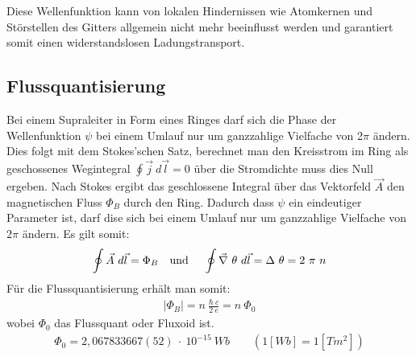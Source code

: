 \documentclass[12pt]{article}
\begin{document}
Diese Wellenfunktion kann von lokalen Hindernissen wie Atomkernen und Störstellen des Gitters allgemein nicht mehr beeinflusst werden und garantiert somit einen widerstandslosen Ladungstransport.

\subsection{Flussquantisierung}
\label{flussquantisierung}

Bei einem Supraleiter in Form eines Ringes darf sich die Phase der Wellenfunktion $\psi$ bei einem Umlauf nur um ganzzahlige Vielfache von 2$\pi$ ändern. Dies folgt mit dem Stokes'schen Satz, berechnet man den Kreisstrom im Ring als geschossenes Wegintegral
$\oint \vec j~d\vec l = 0$ über die Stromdichte muss dies Null ergeben. Nach Stokes ergibt das geschlossene Integral über das Vektorfeld $\vec A$ den magnetischen Fluss $\Phi_B$ durch den Ring. Dadurch dass $\psi$ ein eindeutiger Parameter ist, darf dise sich bei einem Umlauf nur um ganzzahlige Vielfache von $2\pi$ ändern. Es gilt somit:
\begin{align}
 \oint\vec A~d\vec l = \Phi_B \textnormal{\quad und \quad} \oint \vec\nabla~\theta~d\vec l = \Delta~\theta = 2~\pi~n
\end{align}
Für die Flussquantisierung erhält man somit:
\begin{align}
 \left|\Phi_B\right| = n~\frac{\hbar~c}{2~e} = n~\Phi_0
\end{align}
wobei $\Phi_0$ das Flussquant oder Fluxoid ist.
\begin{align}
 \Phi_0 = 2,067833667(52)~\cdot~10^{-15} ~ Wb \quad \quad (1[Wb] = 1[Tm^2])
\end{align}
\end{document}
